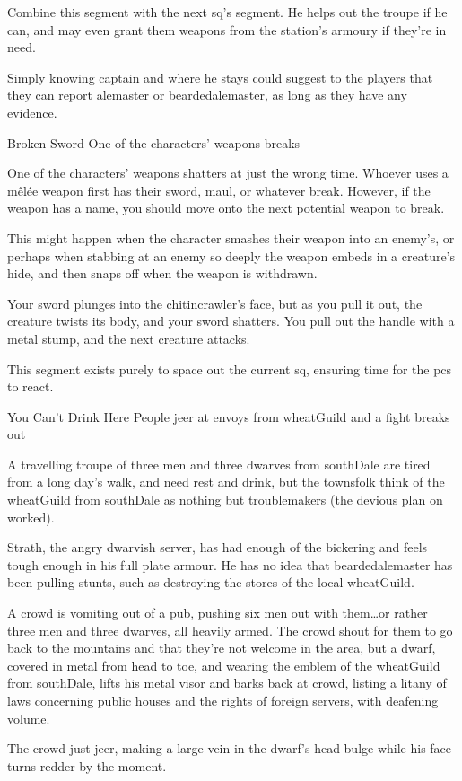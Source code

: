 Combine this \gls{segment} with the next \gls{sq}'s \gls{segment}.
He helps out the troupe if he can, and may even grant them weapons from the station's armoury if they're in need.

\captain

Simply knowing \gls{captain} and where he stays could suggest to the players that they can report \gls{alemaster} or \gls{beardedalemaster}, as long as they have any evidence.

{\squash Broken Sword}%
{One of the characters' weapons breaks}%

One of the characters' weapons shatters at just the wrong time.
Whoever uses a m\^el\'ee weapon first has their sword, maul, or whatever break.
However, if the weapon has a name, you should move onto the next potential weapon to break.

This might happen when the character smashes their weapon into an enemy's, or perhaps when stabbing at an enemy so deeply the weapon embeds in a creature's hide, and then snaps off when the weapon is withdrawn.

\begin{boxtext}
  Your sword plunges into the chitincrawler's face, but as you pull it out, the creature twists its body, and your sword shatters.
  You pull out the handle with a metal stump, and the next creature attacks.
\end{boxtext}

This \gls{segment} exists purely to space out the current \gls{sq}, ensuring time for the \glspl{pc} to react.

{You Can't Drink Here}%
{People jeer at envoys from  \gls{wheatGuild} and a fight breaks out}%

A travelling troupe of three men and three dwarves from \gls{southDale} are tired from a long day's walk, and need rest and drink, but the townsfolk think of the \gls{wheatGuild} from \gls{southDale} as nothing but troublemakers (the devious plan on  worked).

Strath, the angry dwarvish \gls{server}, has had enough of the bickering and feels tough enough in his full plate armour.
He has no idea that \gls{beardedalemaster} has been pulling stunts, such as destroying the stores of the local \gls{wheatGuild}.

\begin{boxtext}
  A crowd is vomiting out of a pub, pushing six men out with them\ldots or rather three men and three dwarves, all heavily armed.
  The crowd shout for them to go back to the mountains and that they're not welcome in the area, but a dwarf, covered in metal from head to toe, and wearing the emblem of the \gls{wheatGuild} from \gls{southDale}, lifts his metal visor and barks back at crowd, listing a litany of laws concerning public houses and the rights of foreign \glspl{server}, with deafening volume.

  The crowd just jeer, making a large vein in the dwarf's head bulge while his face turns redder by the moment.
\end{boxtext}

